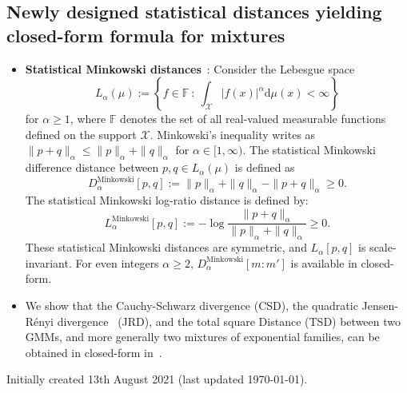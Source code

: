 \documentclass[11pt]{article}
\def\st{\ :\ }
\def\bbF{\mathbb{F}}
\def\eqdef{:=}
\def\dmu{\mathrm{d}\mu}
\def\calX{\mathcal{X}}
\def\calX{\mathcal{X}}
\def\dmu{\mathrm{d}\mu}
\begin{document}


\subsection{Newly designed statistical distances yielding closed-form formula for mixtures}\label{sec:mix:newdist}


\begin{itemize}
	\item {\bf Statistical Minkowski distances}~\cite{StatMinkGMM-2019}:
	Consider the   Lebesgue space 
	$$
	L_\alpha(\mu)  \eqdef \left\{ f\in \bbF \st  \int_\calX |f(x)|^\alpha \dmu(x) <\infty \right\}
	$$  
	for $\alpha\geq 1$, where   $\bbF$ denotes the set of all real-valued measurable functions defined on the support $\calX$. Minkowski's inequality writes as
$\|p+q\|_\alpha \leq \|p\|_\alpha+\|q\|_\alpha$ for $\alpha\in [1,\infty)$.
 The statistical Minkowski difference distance between $p,q\in L_\alpha(\mu)$ is defined as
\begin{equation}
D_\alpha^{\mathrm{Minkowski}}[p,q] \eqdef \|p\|_\alpha+\|q\|_\alpha - \|p+q\|_\alpha\geq 0.
\end{equation}
The statistical Minkowski log-ratio distance is defined by:
\begin{equation}
L_\alpha^{\mathrm{Minkowski}}[p,q] \eqdef -\log \frac{\|p+q\|_\alpha}{\|p\|_\alpha+\|q\|_\alpha}\geq 0.
\end{equation}
These statistical Minkowski distances are symmetric, and $L_\alpha[p,q]$ is scale-invariant.
For even integers $\alpha\geq 2$, $D_\alpha^{\mathrm{Minkowski}}[m:m']$ is available in closed-form.


\item We show that the Cauchy-Schwarz divergence (CSD), the quadratic Jensen-R\'enyi divergence~\cite{JRGMM-2009} (JRD), and the total square Distance (TSD) between two GMMs, and more generally two mixtures of exponential families, can be obtained in closed-form in~\cite{nielsen2012closed}.
\end{itemize}



%
%
%
%

\vskip 1cm
Initially created 13th August 2021 (last updated \today).



\end{document}
